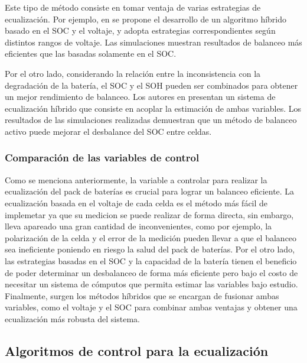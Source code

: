 Este tipo de m\'etodo consiste en tomar ventaja de varias estrategias de
ecualizaci\'on. Por ejemplo, en \cite{ZHANG20194702} se propone el desarrollo de 
un algoritmo h\'ibrido basado en el \acrshort{SOC} y el voltaje, y adopta 
estrategias correspondientes seg\'un distintos rangos de voltaje. Las 
simulaciones muestran resultados de balanceo m\'as eficientes que las basadas 
solamente en el \acrshort{SOC}. 

Por el otro lado, considerando la relaci\'on entre la inconsistencia con la
degradaci\'on de la bater\'ia, el \acrshort{SOC} y el \acrshort{SOH} pueden ser
combinados para obtener un mejor rendimiento de balanceo. Los autores en
\cite{REN2019908} presentan un sistema de ecualizaci\'on h\'ibrido que consiste 
en acoplar la estimaci\'on de ambas variables. Los resultados de las 
simulaciones realizadas demuestran que un m\'etodo de balanceo activo puede 
mejorar el desbalance del \acrshort{SOC} entre celdas.

\subsubsection{Comparaci\'on de las variables de control}

Como se menciona anteriormente, la variable a controlar para realizar la
ecualizaci\'on del pack de bater\'ias es crucial para lograr un balanceo
eficiente. La ecualizaci\'on basada en el voltaje de cada celda es el m\'etodo
m\'as f\'acil de implemetar ya que su medicion se puede realizar de forma
directa, sin embargo, lleva apareado una gran cantidad de inconvenientes, como
por ejemplo, la polarizaci\'on de la celda y el error de la medici\'on pueden
llevar a que el balanceo sea ineficiente poniendo en riesgo la salud del pack
de bater\'ias. Por el otro lado, las estrategias basadas en el \acrshort{SOC} y
la capacidad de la bater\'ia tienen el beneficio de poder determinar un 
desbalanceo de forma m\'as eficiente pero bajo el costo de necesitar un sistema 
de c\'omputos que permita estimar las variables bajo estudio. Finalmente, surgen
los m\'etodos h\'ibridos que se encargan de fusionar ambas variables, como el
voltaje y el \acrshort{SOC} para combinar ambas ventajas y obtener una
ecualizaci\'on m\'as robusta del sistema.

\subsection{Algoritmos de control para la ecualizaci\'on}

